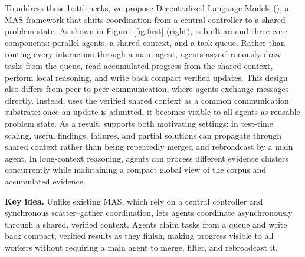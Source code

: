 To address these bottlenecks, we propose Decentralized Language Models (\toolName{}), a MAS framework that shifts coordination from a central controller to a shared problem state. As shown in Figure~\ref{fig:first} (right), \toolName{} is built around three core components: parallel agents, a shared context, and a task queue. Rather than routing every interaction through a main agent, agents asynchronously draw tasks from the queue, read accumulated progress from the shared context, perform local reasoning, and write back compact verified updates. This design also differs from peer-to-peer communication, where agents exchange messages directly. Instead, \toolName{} uses the verified shared context as a common communication substrate: once an update is admitted, it becomes visible to all agents as reusable problem state. As a result, \toolName{} supports both motivating settings: in test-time scaling, useful findings, failures, and partial solutions can propagate through shared context rather than being repeatedly merged and rebroadcast by a main agent. In long-context reasoning, agents can process different evidence clusters concurrently while maintaining a compact global view of the corpus and accumulated evidence.
\begin{keyidea}
\textbf{Key idea.} Unlike existing MAS, which rely on a central controller and synchronous scatter--gather coordination, \toolName{} lets agents coordinate asynchronously through a shared, verified context. Agents claim tasks from a queue and write back compact, verified results as they finish, making progress visible to all workers without requiring a main agent to merge, filter, and rebroadcast it.
\end{keyidea}

